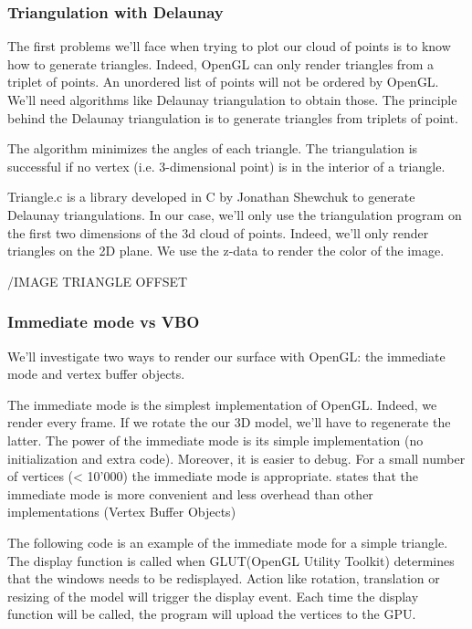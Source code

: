 \subsubsection{Triangulation with Delaunay}

The first problems we'll face when trying to plot our cloud of points is to know how to generate triangles. Indeed, OpenGL can only render triangles from a triplet of points. An unordered list of points will not be ordered by OpenGL. We'll need  algorithms like Delaunay triangulation to obtain those.
The principle behind the Delaunay triangulation is to generate triangles from triplets of point. 

The algorithm minimizes the angles of each triangle. The triangulation is successful if no vertex (i.e. 3-dimensional point) is in the interior of a triangle.

Triangle.c is a library developed in C by Jonathan Shewchuk \cite{shewchuk96b} to generate Delaunay triangulations. In our case, we'll only use the triangulation program on the first two dimensions of the 3d cloud of points. Indeed, we'll only render triangles on the 2D plane. We use the z-data to render the color of the image.

/IMAGE TRIANGLE OFFSET


\subsubsection{Immediate mode vs VBO}

We'll investigate two ways to render our surface with OpenGL: the immediate mode and vertex buffer objects.

The immediate mode is the simplest implementation of OpenGL. Indeed, we render  every frame. If we rotate the our 3D model, we'll have to regenerate the latter. The power of the immediate mode is its simple implementation (no initialization and extra code). Moreover, it is easier to debug. For a small number of vertices (< 10'000) the immediate mode is appropriate. \cite{opengl1} states that the immediate mode is more convenient and less overhead than other implementations (Vertex Buffer Objects)

The following code is an example of the immediate mode for a simple triangle. The display function is called when GLUT(OpenGL Utility Toolkit) determines that the windows needs to be redisplayed. Action like rotation, translation or resizing of the model will trigger the display event. Each time the display function will be called, the program will upload the vertices to the GPU.

